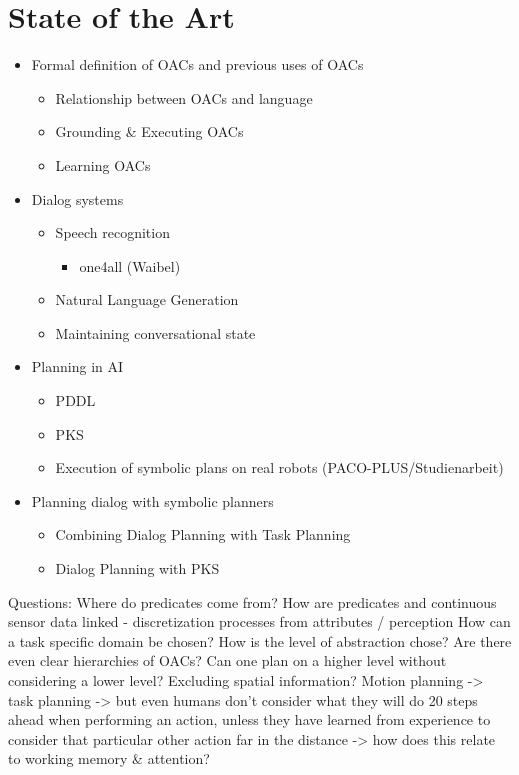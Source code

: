 \documentclass[english,ngerman]{KITreprt}
\begin{document}
\chapter{State of the Art}
\begin{itemize}
    \item Formal definition of OACs and previous uses of OACs
        \begin{itemize}
            \item Relationship between OACs and language
            \item Grounding \& Executing OACs
            \item Learning OACs
        \end{itemize}
    \item Dialog systems
        \begin{itemize}
            \item Speech recognition
                \begin{itemize}
                    \item one4all (Waibel)
                \end{itemize}
            \item Natural Language Generation
            \item Maintaining conversational state
        \end{itemize}
    \item Planning in AI
        \begin{itemize}
            \item PDDL
            \item PKS
            \item Execution of symbolic plans on real robots (PACO-PLUS/Studienarbeit)
        \end{itemize}
    \item Planning dialog with symbolic planners
        \begin{itemize}
            \item Combining Dialog Planning with Task Planning
            \item Dialog Planning with PKS
        \end{itemize}
\end{itemize}

Questions:
Where do predicates come from?
How are predicates and continuous sensor data linked
  - discretization processes from attributes / perception
How can a task specific domain be chosen?
How is the level of abstraction chose?
Are there even clear hierarchies of OACs?
Can one plan on a higher level without considering a lower level?
Excluding spatial information? Motion planning -> task planning
-> but even humans don't consider what they will do 20 steps ahead when performing an action, unless they have learned from experience to consider that particular other action far in the distance -> how does this relate to working memory \& attention?
\end{document}
